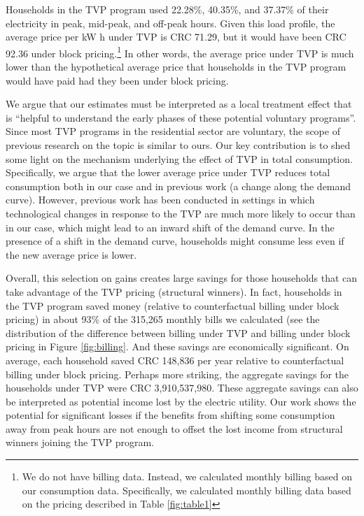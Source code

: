 Households in the TVP program used 22.28\%, 40.35\%, and 37.37\% of their electricity in peak, mid-peak, and off-peak hours. Given this load profile, the average price per kW h under TVP is CRC 71.29, but it would have been CRC 92.36 under block pricing.\footnote{We do not have billing data. Instead, we calculated monthly billing based on our consumption data. Specifically, we calculated monthly billing data based on the pricing described in Table \ref{fig:table1}} In other words, the average price under TVP is much lower than the hypothetical average price that households in the TVP program would have paid had they been under block pricing.

We argue that our estimates must be interpreted as a local treatment effect that is “helpful to understand the early phases of these potential voluntary programs”. Since most TVP programs in the residential sector are voluntary, the scope of previous research on the topic is similar to ours. Our key contribution is to shed some light on the mechanism underlying the effect of TVP in total consumption. Specifically, we argue that the lower average price under TVP reduces total consumption both in our case and in previous work (a change along the demand curve). However, previous work has been conducted in settings in which technological changes in response to the TVP are much more likely to occur than in our case, which might lead to an inward shift of the demand curve. In the presence of a shift in the demand curve, households might consume less even if the new average price is lower.

Overall, this selection on gains creates large savings for those households that can take advantage of the TVP pricing (structural winners). In fact, households in the TVP program saved money (relative to counterfactual billing under block pricing) in about 93\% of the 315,265 monthly bills we calculated (see the distribution of the difference between billing under TVP and billing under block pricing in Figure \ref{fig:billing}. And these savings are economically significant. On average, each household saved CRC 148,836 per year relative to counterfactual billing under block pricing. Perhaps more striking, the aggregate savings for the households under TVP were CRC 3,910,537,980. These aggregate savings can also be interpreted as potential income lost by the electric utility. Our work shows the potential for significant losses if the benefits from shifting some consumption away from peak hours are not enough to offset the lost income from structural winners joining the TVP program.

